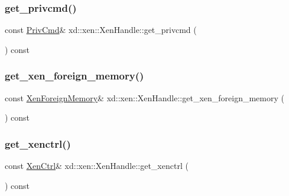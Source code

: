 \subsubsection{\texorpdfstring{get\+\_\+privcmd()}{get\_privcmd()}}
{\footnotesize\ttfamily const \mbox{\hyperlink{classxd_1_1xen_1_1_priv_cmd}{Priv\+Cmd}}\& xd\+::xen\+::\+Xen\+Handle\+::get\+\_\+privcmd (\begin{DoxyParamCaption}{ }\end{DoxyParamCaption}) const\hspace{0.3cm}{\ttfamily [inline]}}

\mbox{\label{classxd_1_1xen_1_1_xen_handle_a1031e052f5f533a94c28ddbeaf5dc457}} 
\subsubsection{\texorpdfstring{get\+\_\+xen\+\_\+foreign\+\_\+memory()}{get\_xen\_foreign\_memory()}}
{\footnotesize\ttfamily const \mbox{\hyperlink{classxd_1_1xen_1_1_xen_foreign_memory}{Xen\+Foreign\+Memory}}\& xd\+::xen\+::\+Xen\+Handle\+::get\+\_\+xen\+\_\+foreign\+\_\+memory (\begin{DoxyParamCaption}{ }\end{DoxyParamCaption}) const\hspace{0.3cm}{\ttfamily [inline]}}

\mbox{\label{classxd_1_1xen_1_1_xen_handle_a02d763db6b65715eba7a411c65e6b137}} 
\subsubsection{\texorpdfstring{get\+\_\+xenctrl()}{get\_xenctrl()}}
{\footnotesize\ttfamily const \mbox{\hyperlink{classxd_1_1xen_1_1_xen_ctrl}{Xen\+Ctrl}}\& xd\+::xen\+::\+Xen\+Handle\+::get\+\_\+xenctrl (\begin{DoxyParamCaption}{ }\end{DoxyParamCaption}) const\hspace{0.3cm}{\ttfamily [inline]}}

